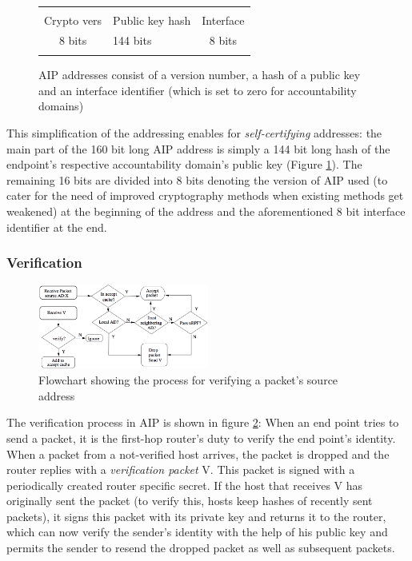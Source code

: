\documentclass{acm_proc_article-sp}
\begin{document}
\begin{figure}[h!]
	\begin{tabularx}{0.47\textwidth}{|c|C|c|}
		\hline & & \\
 		Crypto vers & Public key hash & Interface \\
		8 bits & 144 bits & 8 bits \\ & & \\
		\hline
	\end{tabularx}
	\caption{AIP addresses consist of a version number, a hash of a public key and an interface identifier (which is set to zero for accountability domains) \cite{aip}}
	\label{fig:aipadr}
\end{figure}

This simplification of the addressing enables for \emph{self-certifying} addresses: the main part of the 160 bit long AIP address is simply a 144 bit long hash of the endpoint's respective accountability domain's public key (Figure \ref{fig:aipadr}). The remaining 16 bits are divided into 8 bits denoting the version of AIP used (to cater for the need of improved cryptography methods when existing methods get weakened) at the beginning of the address and the aforementioned 8 bit interface identifier at the end.

\subsubsection{Verification}
\begin{figure}[t]
  \includegraphics[width=0.5\textwidth]{images/aipflow.PNG}
  \caption{Flowchart showing the process for verifying a packet's source address \cite{aip}}
  \label{fig:aipflow}
\end{figure}
The verification process in AIP is shown in figure \ref{fig:aipflow}: When an end point tries to send a packet, it is the first-hop router's duty to verify the end point's identity. When a packet from a not-verified host arrives, the packet is dropped and the router replies with a \emph{verification packet} V. This packet is signed with a periodically created router specific secret. If the host that receives V has originally sent the packet (to verify this, hosts keep hashes of recently sent packets), it signs this packet with its private key and returns it to the router, which can now verify the sender's identity with the help of his public key and permits the sender to resend the dropped packet as well as subsequent packets.
\end{document}
